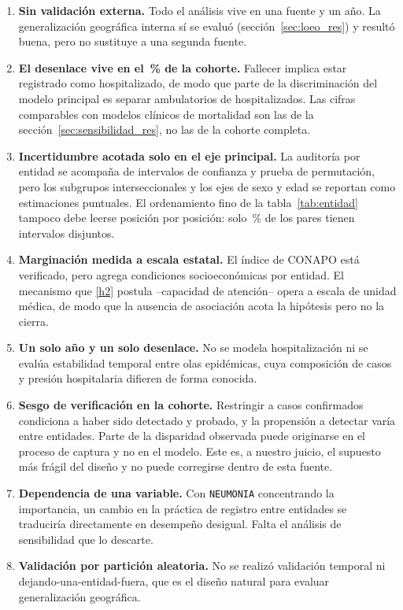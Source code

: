 \begin{enumerate}[leftmargin=*]
  \item \textbf{Sin validación externa.} Todo el análisis vive en una fuente y un
    año. La generalización geográfica interna sí se evaluó
    (sección~\ref{sec:loeo_res}) y resultó buena, pero no sustituye a una segunda
    fuente.
  \item \textbf{El desenlace vive en el \fracHosp\,\% de la cohorte.} Fallecer
    implica estar registrado como hospitalizado, de modo que parte de la
    discriminación del modelo principal es separar ambulatorios de hospitalizados.
    Las cifras comparables con modelos clínicos de mortalidad son las de la
    sección~\ref{sec:sensibilidad_res}, no las de la cohorte completa.
  \item \textbf{Incertidumbre acotada solo en el eje principal.} La auditoría
    por entidad se acompaña de intervalos de confianza y prueba de permutación,
    pero los subgrupos interseccionales y los ejes de sexo y edad se reportan como
    estimaciones puntuales. El ordenamiento fino de la tabla~\ref{tab:entidad}
    tampoco debe leerse posición por posición: solo \paresPct\,\% de los pares
    tienen intervalos disjuntos.
  \item \textbf{Marginación medida a escala estatal.} El índice de CONAPO está
    verificado, pero agrega condiciones socioeconómicas por entidad. El mecanismo
    que \ref{h2} postula --capacidad de atención-- opera a escala de unidad médica,
    de modo que la ausencia de asociación acota la hipótesis pero no la cierra.
  \item \textbf{Un solo año y un solo desenlace.} No se modela hospitalización ni
    se evalúa estabilidad temporal entre olas epidémicas, cuya composición de casos
    y presión hospitalaria difieren de forma conocida.
  \item \textbf{Sesgo de verificación en la cohorte.} Restringir a casos
    confirmados condiciona a haber sido detectado y probado, y la propensión a
    detectar varía entre entidades. Parte de la disparidad observada puede
    originarse en el proceso de captura y no en el modelo. Este es, a nuestro
    juicio, el supuesto más frágil del diseño y no puede corregirse dentro de esta
    fuente.
  \item \textbf{Dependencia de una variable.} Con \texttt{NEUMONIA} concentrando
    la importancia, un cambio en la práctica de registro entre entidades se
    traduciría directamente en desempeño desigual. Falta el análisis de
    sensibilidad que lo descarte.
  \item \textbf{Validación por partición aleatoria.} No se realizó validación
    temporal ni dejando-una-entidad-fuera, que es el diseño natural para evaluar
    generalización geográfica.
\end{enumerate}
